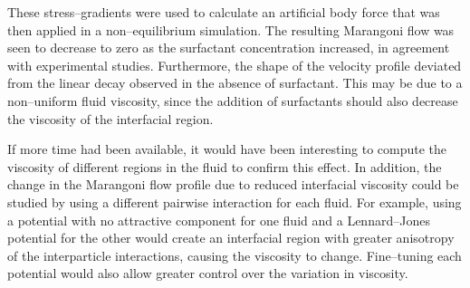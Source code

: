 These stress--gradients were used to calculate an artificial body force that was then applied in a non--equilibrium simulation.
The resulting Marangoni flow was seen to decrease to zero as the surfactant concentration increased, in agreement with experimental studies.
Furthermore, the shape of the velocity profile deviated from the linear decay observed in the absence of surfactant.
This may be due to a non--uniform fluid viscosity, since the addition of surfactants should also decrease the viscosity of the interfacial region.

If more time had been available, it would have been interesting to compute the viscosity of different regions in the fluid to confirm this effect.
In addition, the change in the Marangoni flow profile due to reduced interfacial viscosity could be studied by using a different pairwise interaction for each fluid.
For example, using a potential with no attractive component for one fluid and a Lennard--Jones potential for the other would create an interfacial region with greater anisotropy of the interparticle interactions, causing the viscosity to change.
Fine--tuning each potential would also allow greater control over the variation in viscosity.
